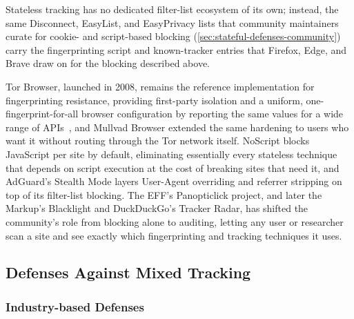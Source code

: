 %
Stateless tracking has no dedicated filter-list ecosystem of its own; instead, the same Disconnect, EasyList, and EasyPrivacy lists that community maintainers curate for cookie- and script-based blocking (\autoref{sec:stateful-defenses-community}) carry the fingerprinting script and known-tracker entries that Firefox, Edge, and Brave draw on for the blocking described above.


%
Tor Browser, launched in 2008, remains the reference implementation for fingerprinting resistance, providing first-party isolation and a uniform, one-fingerprint-for-all browser configuration by reporting the same values for a wide range of APIs~\cite{perryDesignImplementationTor2013}, and Mullvad Browser extended the same hardening to users who want it without routing through the Tor network itself.
%
NoScript blocks JavaScript per site by default, eliminating essentially every stateless technique that depends on script execution at the cost of breaking sites that need it, and AdGuard's Stealth Mode layers User-Agent overriding and referrer stripping on top of its filter-list blocking.
%
The EFF's Panopticlick project, and later the Markup's Blacklight and DuckDuckGo's Tracker Radar, has shifted the community's role from blocking alone to auditing, letting any user or researcher scan a site and see exactly which fingerprinting and tracking techniques it uses.








\subsection{Defenses Against Mixed Tracking}
\label{sec:mixed-defenses}



\subsubsection{Industry-based Defenses}
\label{sec:mixed-defenses-industry}



